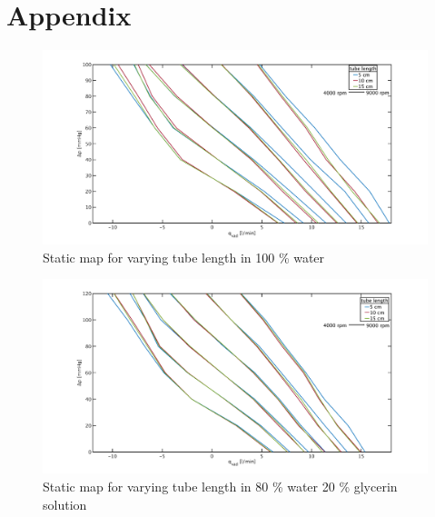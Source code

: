 \chapter{Appendix}
\begin{figure}[ht!]
  \includegraphics[width=\textwidth]{images/chapt_4/100w_tube_length_new.pdf}
  \caption[Static map for different tube length in 100 \% water]{Static map for varying tube length in 100 \% water}
  \label{fig:anh_1}
\end{figure}

\begin{figure}[ht!]
  \includegraphics[width=\textwidth]{images/chapt_4/80w20g_tube_length_new.pdf}
  \caption[Static map for different tube length in 80 \% water 20 \% glycerin solution]{Static map for varying tube length in 80 \% water 20 \% glycerin solution}
 \label{fig:anh_2}
\end{figure}

